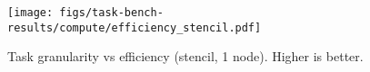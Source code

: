 \begin{figure}[t]
\centering
\texttt{[image: figs/task-bench-results/compute/efficiency\_stencil.pdf]}
\vspace{-0.5cm}
\caption{Task granularity vs efficiency (stencil, 1 node). Higher is better.\label{fig:efficiency}}
\vspace{-0.05cm}
\end{figure}
